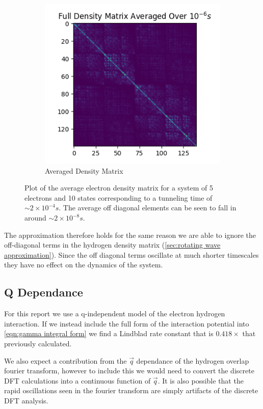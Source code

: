 \begin{figure}[htbp]
\begin{subfigure}{0.45\linewidth}
        \includegraphics[width = 0.9\linewidth]{Figures/Discussion/Full average matrix 10-6s.png} %
        \caption{Averaged Density Matrix
        }\label{sub@fig:averaged density matrix}
    \end{subfigure}
    \caption{
    Plot of the average
    electron density matrix
    for a system of 5 electrons
    and 10 states
    corresponding to a tunneling time
    of \(\sim 2\times{}10^{-4}s\).
    The average off diagonal
    elements can be seen to
    fall in around
    \(\sim 2\times{}10^{-8}s\).
    }\label{fig:density matrix analysis}
\end{figure}
The approximation
therefore holds for the
same reason we are able
to ignore the off-diagonal
terms in the hydrogen density
matrix
(\cref{sec:rotating wave approximation}).
Since
the off diagonal terms
oscillate at much shorter
timescales they have
no effect on the dynamics
of the system.

\subsection{Q Dependance}
For this report we use a
q-independent model of the
electron hydrogen interaction.
If we instead include the full form
of the interaction potential
into \cref{eqn:gamma integral form}
we find a
Lindblad rate constant that
is \(0.418 \times{}\) that
previously calculated.

We also expect a
contribution from the
\(\vec{q}\) dependance of the hydrogen overlap
fourier transform, however
to
include this we would need to
convert the discrete
DFT calculations into a continuous
function of \(\vec{q}\).
It is also possible that
the rapid oscillations
seen in the fourier transform
are simply artifacts of the
discrete DFT analysis.


